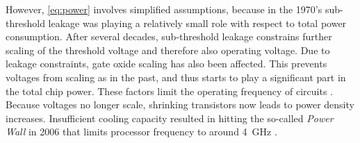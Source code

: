 However, \autoref{eq:power} involves simplified assumptions, because in the 1970's sub-threshold leakage was playing a relatively small role with respect to total power consumption. After several decades, sub-threshold leakage constrains further scaling of the threshold voltage and therefore also operating voltage. Due to leakage constraints, gate oxide scaling has also been affected. This prevents voltages from scaling as in the past, and thus starts to play a significant part in the total chip power. These factors limit the operating frequency of circuits \cite{mark-bohr}. Because voltages no longer scale, shrinking transistors now leads to power density increases. Insufficient cooling capacity resulted in hitting the so-called \textit{Power Wall} in 2006 that limits processor frequency to around \SI{4}{\giga\hertz} \cite{dennard-scaling}.






